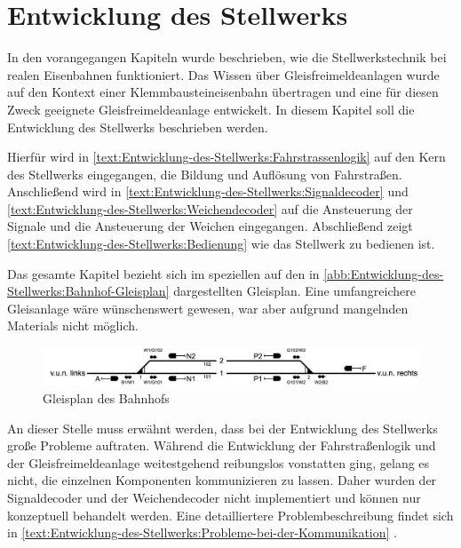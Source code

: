\chapter{Entwicklung des Stellwerks}\label{text:Entwicklung-des-Stellwerks}

In den vorangegangen Kapiteln wurde beschrieben, wie die Stellwerkstechnik bei realen Eisenbahnen funktioniert. Das Wissen über Gleisfreimeldeanlagen wurde auf den Kontext einer Klemmbausteineisenbahn übertragen und eine für diesen Zweck geeignete Gleisfreimeldeanlage entwickelt. In diesem Kapitel soll die Entwicklung des Stellwerks beschrieben werden.

Hierfür wird in \autoref{text:Entwicklung-des-Stellwerks:Fahrstrassenlogik}  auf den Kern des Stellwerks eingegangen, die Bildung und Auflösung von Fahrstraßen. Anschließend wird in \autoref{text:Entwicklung-des-Stellwerks:Signaldecoder}  und \autoref{text:Entwicklung-des-Stellwerks:Weichendecoder}  auf die Ansteuerung der Signale und die Ansteuerung der Weichen eingegangen. Abschließend zeigt \autoref{text:Entwicklung-des-Stellwerks:Bedienung}  wie das Stellwerk zu bedienen ist.

Das gesamte Kapitel bezieht sich im speziellen auf den in \autoref{abb:Entwicklung-des-Stellwerks:Bahnhof-Gleisplan} dargestellten Gleisplan. Eine umfangreichere Gleisanlage wäre wünschenswert gewesen, war aber aufgrund mangelnden Materials nicht möglich.

\begin{figure}[H]
    \centering
    \includegraphics[width=\textwidth]{Assets/Images/5-Entwicklung-des-Stellwerks/Bahnhof-Gleisplan.png}
    \caption{Gleisplan des Bahnhofs}\label{abb:Entwicklung-des-Stellwerks:Bahnhof-Gleisplan}
\end{figure}

An dieser Stelle muss erwähnt werden, dass bei der Entwicklung des Stellwerks große Probleme auftraten. Während die Entwicklung der Fahrstraßenlogik und der Gleisfreimeldeanlage weitestgehend reibungslos vonstatten ging, gelang es nicht, die einzelnen Komponenten kommunizieren zu lassen. Daher wurden der Signaldecoder und der Weichendecoder nicht implementiert und können nur konzeptuell behandelt werden. Eine detailliertere Problembeschreibung findet sich in \autoref{text:Entwicklung-des-Stellwerks:Probleme-bei-der-Kommunikation} .

